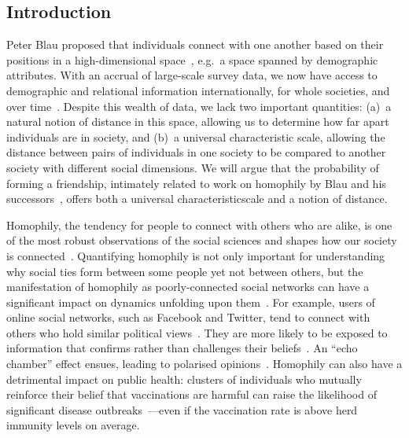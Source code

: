 \documentclass{scrartcl}
\begin{document}
\begin{refsection}

\section{Introduction\label{sec:introduction}}

Peter Blau proposed that individuals connect with one another based on their positions in a high-dimensional space~\cite{Blau1977}, e.g.\ a space spanned by demographic attributes. With an accrual of large-scale survey data, we now have access to demographic and relational information internationally, for whole societies, and over time~\cite{McPherson2001,McPherson2006,Mossong2008}. Despite this wealth of data, we lack two important quantities: (a)~a natural notion of distance in this space, allowing us to determine how far apart individuals are in society, and (b)~a universal characteristic scale, allowing the distance between pairs of individuals in one society to be compared to another society with different social dimensions. We will argue that the probability of forming a friendship, intimately related to work on homophily by Blau and his successors~\cite{McPherson2001}, offers both a universal characteristicscale and a notion of distance.

Homophily, the tendency for people to connect with others who are alike, is one of the most robust observations of the social sciences and shapes how our society is connected~\cite{McPherson2001}. Quantifying homophily is not only important for understanding why social ties form between some people yet not between others, but the manifestation of homophily as poorly-connected social networks can have a significant impact on dynamics unfolding upon them~\cite{Golub2012}. For example, users of online social networks, such as Facebook and Twitter, tend to connect with others who hold similar political views~\cite{Boutyline2017}. They are more likely to be exposed to information that confirms rather than challenges their beliefs~\cite{Bakshy2015}. An ``echo chamber'' effect ensues, leading to polarised opinions~\cite{DeMarzo2003}. Homophily can also have a detrimental impact on public health: clusters of individuals who mutually reinforce their belief that vaccinations are harmful can raise the likelihood of significant disease outbreaks~\cite{Salathe2008}---even if the vaccination rate is above herd immunity levels on average.


\end{refsection}
\end{document}
